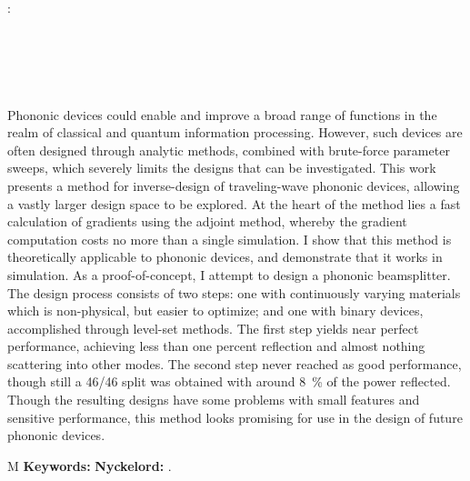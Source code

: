 \thesisImprintTitle:\\
\thesisImprintSubtitle\\[1ex]
\thesisAuthor\\
\thesisDepartment\\
\thesisUniversity

\thispagestyle{plain}           %
\section*{\abstractname}
Phononic devices could enable and improve a broad range of functions in
the realm of classical and quantum information processing.
However, such devices are often designed through analytic methods, combined with brute-force
parameter sweeps, which severely limits the designs that can be investigated.
This work presents a method for inverse-design of traveling-wave phononic devices,
allowing a vastly larger design space to be explored.
At the heart of the method lies a fast calculation of gradients using the
adjoint method, whereby the gradient computation costs no more than a single
simulation.
I show that this method is theoretically applicable to phononic devices,
and demonstrate that it works in simulation.
As a proof-of-concept, I attempt to design a phononic beamsplitter.
The design process consists of two steps:
one with continuously varying materials which is non-physical,
but easier to optimize;
and one with binary devices, accomplished through level-set methods.
The first step yields near perfect performance, achieving less than one percent
reflection and almost nothing scattering into other modes.
The second step never reached as good performance, though still a 46/46
split was obtained with around 8~\% of the power reflected.
Though the resulting designs have some problems with small features and
sensitive performance,
this method looks promising for use in the design of future phononic devices.

\if\thesisType M
    \textbf{Keywords:}
\else
    \textbf{Nyckelord:}
\fi
\thesisKeywords.

\if{}
\newpage                %
\thispagestyle{empty}
\mbox{}
\fi
